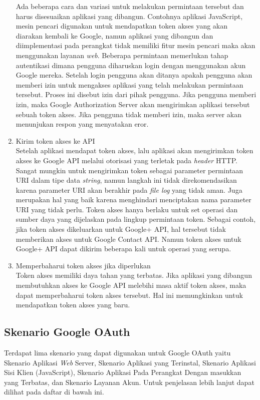 \begin{enumerate}[(1)]
Ada beberapa cara dan variasi untuk melakukan permintaan tersebut dan harus disesuaikan aplikasi yang dibangun. Contohnya aplikasi JavaScript, mesin pencari digunakan untuk mendapatkan token akses yang akan diarakan kembali ke Google, namun aplikasi yang dibangun dan diimplementasi pada perangkat tidak memiliki fitur mesin pencari maka akan menggunakan layanan {\it web}. Beberapa permintaan memerlukan tahap autentikasi dimana pengguna diharuskan login dengan menggunakan akun Google mereka. Setelah login pengguna akan ditanya apakah pengguna akan memberi izin untuk mengakses aplikasi yang telah melakukan permintaan tersebut. Proses ini disebut izin dari pihak pengguna. Jika pengguna memberi izin, maka Google Authorization Server akan mengirimkan aplikasi tersebut sebuah token akses. Jika pengguna tidak memberi izin, maka server akan menunjukan respon yang menyatakan eror.
\item Kirim token akses ke API\\
Setelah aplikasi mendapat token akses, lalu aplikasi akan mengirimkan token akses ke Google API melalui otorisasi yang terletak pada {\it header} HTTP. Sangat mungkin untuk mengirimkan token sebagai parameter permintaan URI dalam tipe data {\it string}, namun langkah ini tidak direkomendasikan karena parameter URI akan berakhir pada {\it file log} yang tidak aman. Juga merupakan hal yang baik karena menghindari menciptakan nama parameter URI yang tidak perlu. Token akses hanya berlaku untuk set operasi dan sumber daya yang dijelaskan pada lingkup permintaan token. Sebagai contoh, jika token akses dikeluarkan untuk Google+ API, hal tersebut tidak memberikan akses untuk Google Contact API. Namun token akses untuk Google+ API dapat dikirim beberapa kali untuk operasi yang serupa.
\item Memperbaharui token akses jika diperlukan\\
Token akses memiliki daya tahan yang terbatas. Jika aplikasi yang dibangun membutuhkan akses ke Google API melebihi masa aktif token akses, maka dapat memperbaharui token akses tersebut. Hal ini memungkinkan untuk mendapatkan token akses yang baru.
\end{enumerate}

\subsection{Skenario Google OAuth}
Terdapat lima skenario yang dapat digunakan untuk Google OAuth yaitu Skenario Aplikasi {\it Web} Server, Skenario Aplikasi yang Terinstal, Skenario Aplikasi Sisi Klien (JavaScript), Skenario Aplikasi Pada Perangkat Dengan masukkan yang Terbatas, dan Skenario Layanan Akun. Untuk penjelasan lebih lanjut dapat dilihat pada daftar di bawah ini.

